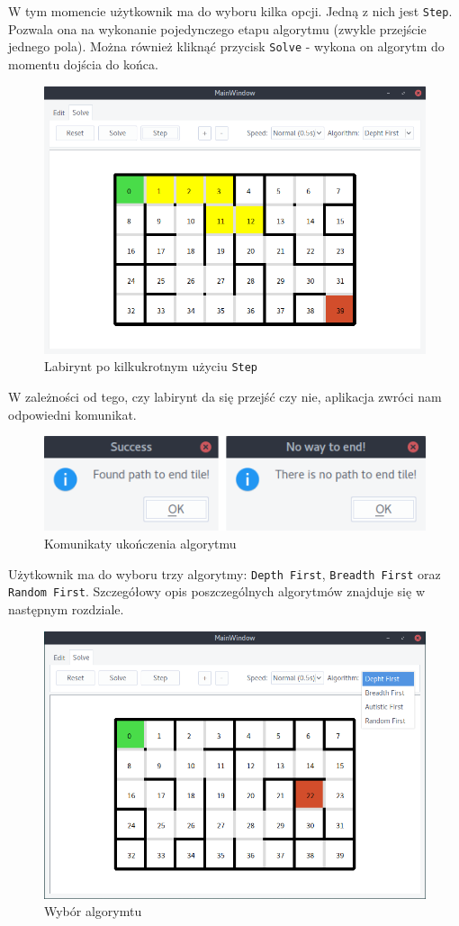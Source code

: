 \documentclass[12pt,a4paper]{article}
\begin{document}
	W tym momencie użytkownik ma do wyboru kilka opcji. Jedną z nich
	jest \texttt{Step}. Pozwala ona na wykonanie pojedynczego etapu
	algorytmu (zwykle przejście jednego pola). Można również kliknąć
	przycisk \texttt{Solve} - wykona on algorytm do momentu dojścia do 
	końca.
	\begin{figure}[H]
		\centering
		\includegraphics[width=0.8\linewidth]{obrazki/6.png}
		\caption{Labirynt po kilkukrotnym użyciu \texttt{Step}}
	\end{figure}
	
	W zależności od tego, czy labirynt da się przejść czy nie, aplikacja
	zwróci nam odpowiedni komunikat.
	\begin{figure}[H]
		\centering
		\includegraphics[width=0.8\linewidth]{obrazki/7i8.png}
		\caption{Komunikaty ukończenia algorytmu}
	\end{figure}
	
	
	Użytkownik ma do wyboru trzy algorytmy: \texttt{Depth First},
	\texttt{Breadth First} oraz \texttt{Random First}. Szczegółowy
	opis poszczególnych algorytmów znajduje się w następnym rozdziale.
	\begin{figure}[H]
		\centering
		\includegraphics[width=0.8\linewidth]{obrazki/9_new.png}
		\caption{Wybór algorymtu}
	\end{figure}
	
\end{document}
